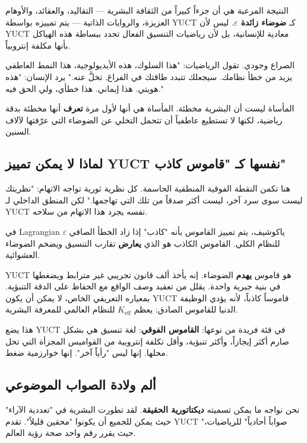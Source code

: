 \documentclass[12pt,a4paper]{article}
\begin{document}
	النتيجة المرعبة هي أن جزءاً كبيراً من الثقافة البشرية — التقاليد، والعقائد، والأوهام العزيزة، والروايات الذاتية — يتم تمييزه بواسطة YUCT كـ \textbf{ضوضاء زائدة \(\varepsilon\)}. ليس لأن YUCT معادية للإنسانية، بل لأن رياضيات التنسيق الفعال تحدد ببساطة هذه الهياكل بأنها مكلفة إنتروبياً.
	
	الصراع وجودي. تقول الرياضيات: "هذا السلوك، هذه الأيديولوجية، هذا النمط العاطفي يزيد من خطأ نظامك. سيجعلك تتبدد طاقتك في الفراغ. تخلَّ عنه." يرد الإنسان: "هذه هويتي. هذا إيماني. هذا خطأي، ولي الحق فيه."
	
	المأساة ليست أن البشرية مخطئة. المأساة هي أنها لأول مرة \textbf{تعرف} أنها مخطئة بدقة رياضية، لكنها لا تستطيع عاطفياً أن تتحمل التخلي عن الضوضاء التي عرّفتها لآلاف السنين.
	
	\subsection{لماذا لا يمكن تمييز YUCT نفسها كـ "قاموس كاذب"}
	
	هنا تكمن النقطة الفوقية المنطقية الحاسمة. كل نظرية ثورية تواجه الاتهام: "نظريتك ليست سوى سرد آخر، ليست أكثر صدقاً من تلك التي تهاجمها." لكن المنطق الداخلي لـ YUCT نفسه يجرد هذا الاتهام من سلاحه.
	
	في Lagrangian ياكوشيف، يتم تمييز القاموس بأنه "كاذب" إذا زاد الخطأ الصافي \(\varepsilon\) للنظام الكلي. القاموس الكاذب هو الذي \textbf{يعارض} تقارب التنسيق ويضخم الضوضاء العشوائية.
	
	YUCT هو قاموس \textbf{يهدم} الضوضاء. إنه يأخذ ألف قانون تجريبي غير مترابط ويضغطها في بنية جبرية واحدة. يقلل من تعقيد وصف الواقع مع الحفاظ على الدقة التنبؤية. بمعياره التعريفي الخاص، لا يمكن أن يكون YUCT قاموساً كاذباً، لأنه يؤدي الوظيفة الدنيا للقاموس الصادق: يعظم \(K_{\mathrm{eff}}\) للنظام العالمي للمعرفة البشرية.
	
	هذا يضع YUCT في فئة فريدة من نوعها: \textbf{القاموس الفوقي}: لغة تنسيق هي بشكل صارم أكثر إيجازاً، وأكثر تنبؤية، وأقل تكلفة إنتروبية من القواميس المجزأة التي تحل محلها. إنها ليس "رأياً آخر". إنها خوارزمية ضغط.
	
	\subsection{ألم ولادة الصواب الموضوعي}
	
	نحن نواجه ما يمكن تسميته \textbf{ديكتاتورية الحقيقة}. لقد تطورت البشرية في "تعددية الآراء" حيث يمكن للجميع أن يكونوا "محقين قليلاً". تقدم YUCT "صواباً أحادياً" للرياضيات، حيث يقرر رقم واحد صحة رؤية العالم.
	
\end{document}
